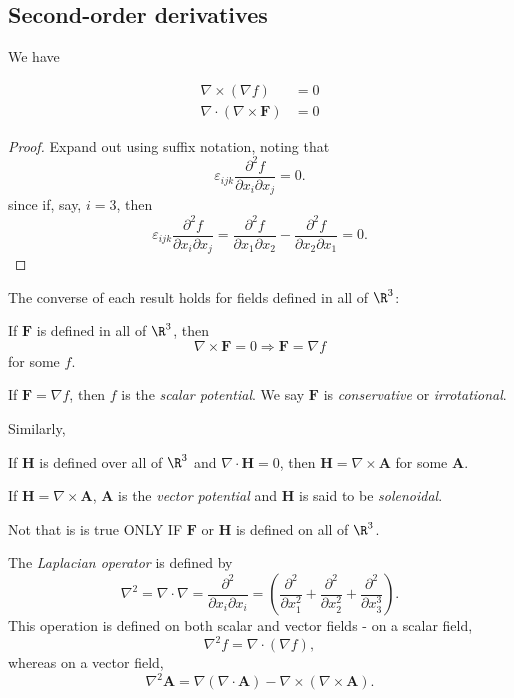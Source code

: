 \documentclass[a4paper]{article}
\begin{document}
\subsection{Second-order derivatives}
We have
\begin{prop}
  \begin{align*}
    \nabla\times (\nabla f) &= 0\\
    \nabla\cdot (\nabla\times \mathbf{F}) &=0
  \end{align*}
\end{prop}

\begin{proof}
  Expand out using suffix notation, noting that
  \[
    \varepsilon_{ijk}\frac{\partial^2 f}{\partial x_i \partial x_j} = 0.
  \]
  since if, say, $i = 3$, then
  \[
    \varepsilon_{ijk}\frac{\partial^2 f}{\partial x_i \partial x_j} = \frac{\partial^2 f}{\partial x_1 \partial x_2} - \frac{\partial^2 f}{\partial x_2 \partial x_1} = 0.
  \]

\end{proof}

The converse of each result holds for fields defined in all of $\R^3$:
\begin{prop}
  If $\mathbf{F}$ is defined in all of $\R^3$, then
  \[
    \nabla\times \mathbf{F} = 0 \Rightarrow  \mathbf{F} = \nabla f
  \]
  for some $f$.
\end{prop}

\begin{defi}
  If $\mathbf{F} = \nabla f$, then $f$ is the \emph{scalar potential}. We say $\mathbf{F}$ is \emph{conservative} or \emph{irrotational}.
\end{defi}
Similarly,
\begin{prop}
  If $\mathbf{H}$ is defined over all of $\R^3$ and $\nabla\cdot \mathbf{H} = 0$, then $\mathbf{H} = \nabla \times \mathbf{A}$ for some $\mathbf{A}$.
\end{prop}

\begin{defi}
  If $\mathbf{H} = \nabla \times \mathbf{A}$, $\mathbf{A}$ is the \emph{vector potential} and $\mathbf{H}$ is said to be \emph{solenoidal}. 
\end{defi}

Not that is is true ONLY IF $\mathbf{F}$ or $\mathbf{H}$ is defined on all of $\R^3$.

\begin{defi}
  The \emph{Laplacian operator} is defined by
  \[
    \nabla^2 = \nabla\cdot \nabla = \frac{\partial^2}{\partial x_i \partial x_i} = \left(\frac{\partial^2}{\partial x_1^2} + \frac{\partial^2}{\partial x_2^2} + \frac{\partial^2}{\partial x_3^3}\right).
  \]
  This operation is defined on both scalar and vector fields - on a scalar field,
  \[
    \nabla^2 f = \nabla\cdot (\nabla f),
  \]
  whereas on a vector field,
  \[
    \nabla^2 \mathbf{A} = \nabla(\nabla\cdot \mathbf{A}) - \nabla\times (\nabla\times \mathbf{A}).
  \]
\end{defi}
\end{document}
